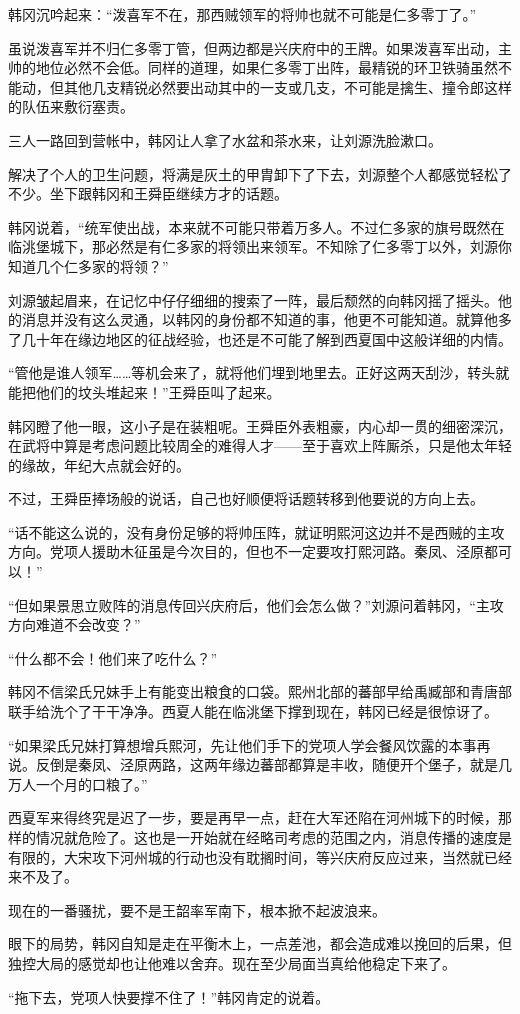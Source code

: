 韩冈沉吟起来：“泼喜军不在，那西贼领军的将帅也就不可能是仁多零丁了。”

虽说泼喜军并不归仁多零丁管，但两边都是兴庆府中的王牌。如果泼喜军出动，主帅的地位必然不会低。同样的道理，如果仁多零丁出阵，最精锐的环卫铁骑虽然不能动，但其他几支精锐必然要出动其中的一支或几支，不可能是擒生、撞令郎这样的队伍来敷衍塞责。

三人一路回到营帐中，韩冈让人拿了水盆和茶水来，让刘源洗脸漱口。

解决了个人的卫生问题，将满是灰土的甲胄卸下了下去，刘源整个人都感觉轻松了不少。坐下跟韩冈和王舜臣继续方才的话题。

韩冈说着，“统军使出战，本来就不可能只带着万多人。不过仁多家的旗号既然在临洮堡城下，那必然是有仁多家的将领出来领军。不知除了仁多零丁以外，刘源你知道几个仁多家的将领？”

刘源皱起眉来，在记忆中仔仔细细的搜索了一阵，最后颓然的向韩冈摇了摇头。他的消息并没有这么灵通，以韩冈的身份都不知道的事，他更不可能知道。就算他多了几十年在缘边地区的征战经验，也还是不可能了解到西夏国中这般详细的内情。

“管他是谁人领军……等机会来了，就将他们埋到地里去。正好这两天刮沙，转头就能把他们的坟头堆起来！”王舜臣叫了起来。

韩冈瞪了他一眼，这小子是在装粗呢。王舜臣外表粗豪，内心却一贯的细密深沉，在武将中算是考虑问题比较周全的难得人才——至于喜欢上阵厮杀，只是他太年轻的缘故，年纪大点就会好的。

不过，王舜臣捧场般的说话，自己也好顺便将话题转移到他要说的方向上去。

“话不能这么说的，没有身份足够的将帅压阵，就证明熙河这边并不是西贼的主攻方向。党项人援助木征虽是今次目的，但也不一定要攻打熙河路。秦凤、泾原都可以！”

“但如果景思立败阵的消息传回兴庆府后，他们会怎么做？”刘源问着韩冈，“主攻方向难道不会改变？”

“什么都不会！他们来了吃什么？”

韩冈不信梁氏兄妹手上有能变出粮食的口袋。熙州北部的蕃部早给禹臧部和青唐部联手给洗个了干干净净。西夏人能在临洮堡下撑到现在，韩冈已经是很惊讶了。

“如果梁氏兄妹打算想增兵熙河，先让他们手下的党项人学会餐风饮露的本事再说。反倒是秦凤、泾原两路，这两年缘边蕃部都算是丰收，随便开个堡子，就是几万人一个月的口粮了。”

西夏军来得终究是迟了一步，要是再早一点，赶在大军还陷在河州城下的时候，那样的情况就危险了。这也是一开始就在经略司考虑的范围之内，消息传播的速度是有限的，大宋攻下河州城的行动也没有耽搁时间，等兴庆府反应过来，当然就已经来不及了。

现在的一番骚扰，要不是王韶率军南下，根本掀不起波浪来。

眼下的局势，韩冈自知是走在平衡木上，一点差池，都会造成难以挽回的后果，但独控大局的感觉却也让他难以舍弃。现在至少局面当真给他稳定下来了。

“拖下去，党项人快要撑不住了！”韩冈肯定的说着。

